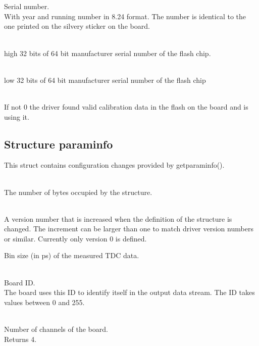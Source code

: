 			\\
			\par

			\\
			Serial number.\\
			With year and running number in 8.24 format. The number is identical to the one printed on the silvery sticker on the board.\par

			\\
			high 32 bits of 64 bit manufacturer serial number of the flash chip.

			\\
			low 32 bits of 64 bit manufacturer serial number of the flash chip

			\\
			If not 0 the driver found valid calibration data in the flash on the board and is using it.\par

		\subsection{Structure \prefix param\tu info}
			This struct contains configuration changes provided by \textsf{\prefix get\tu param\tu info()}.

			\\
			The number of bytes occupied by the structure. \par

			\\
			A version number that is increased when the definition of the structure is changed. The increment can be larger than one to match driver version numbers or similar. Currently only version 0 is defined.\par


			Bin size (in ps) of the measured TDC data.

			\\
			Board ID.\\
			The board uses this ID to identify itself in the output data stream. The ID takes values between 0 and 255.\par

			\\
			Number of channels of the board.\\
			Returns 4.\par


